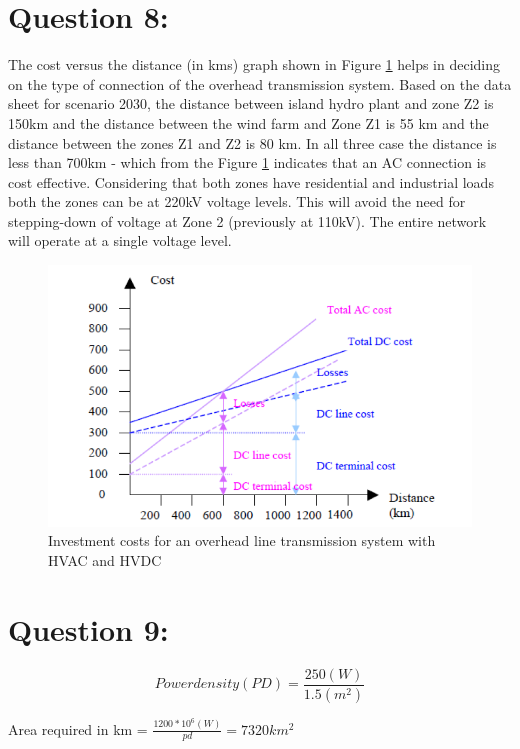 \section*{\textbf{Question 8:}}
The cost versus the distance (in kms) graph shown in Figure \ref{fig:AC_DC} helps in deciding on the type of connection of the overhead transmission system. Based on the data sheet for scenario 2030, the distance between island hydro plant and zone Z2 is 150km and the distance between the wind farm and Zone Z1 is 55 km and the distance between the zones Z1 and Z2 is 80 km. In all three case the distance is less than 700km - which from the Figure \ref{fig:AC_DC} indicates that an AC connection is cost effective. Considering that both zones have residential and industrial loads both the zones can be at 220kV voltage levels. This will avoid the need for stepping-down of voltage at Zone 2 (previously at 110kV). The entire network will operate at a single voltage level.
\begin{figure}[H]
    \centering
        \includegraphics[width=0.8 \linewidth]{AC_DC_distance.png}
        \caption{Investment costs for an overhead line transmission system with HVAC and HVDC}
        \label{fig:AC_DC}
\end{figure}
\section*{\textbf{Question 9:}}
\begin{equation}
Power density (PD) =\frac{250(W)}{1.5({{m}^{2}})}
\end{equation}

Area required in km = $\frac{1200*{{10}^{6}}(W)}{pd}= 7320 km^2$









